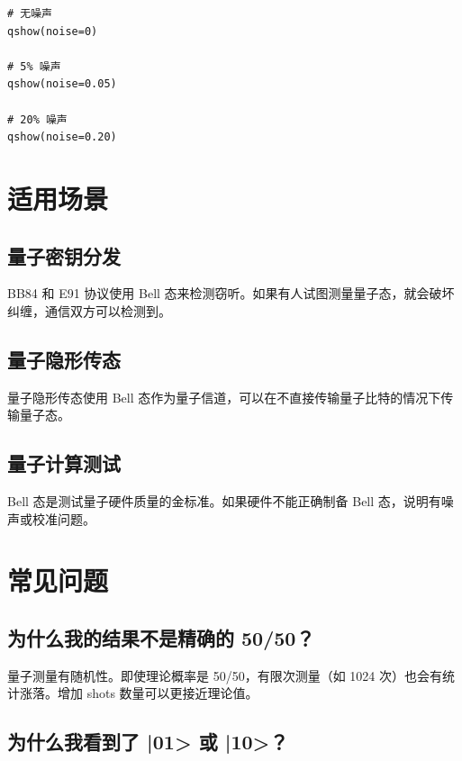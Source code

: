\documentclass[12pt,a4paper]{article}
\begin{document}
\begin{lstlisting}[style=python]
# 无噪声
qshow(noise=0)

# 5% 噪声
qshow(noise=0.05)

# 20% 噪声
qshow(noise=0.20)
\end{lstlisting}

\section{适用场景}

\subsection{量子密钥分发}

BB84 和 E91 协议使用 Bell 态来检测窃听。如果有人试图测量量子态，就会破坏纠缠，通信双方可以检测到。

\subsection{量子隐形传态}

量子隐形传态使用 Bell 态作为量子信道，可以在不直接传输量子比特的情况下传输量子态。

\subsection{量子计算测试}

Bell 态是测试量子硬件质量的金标准。如果硬件不能正确制备 Bell 态，说明有噪声或校准问题。

\section{常见问题}

\subsection{为什么我的结果不是精确的 50/50？}

量子测量有随机性。即使理论概率是 50/50，有限次测量（如 1024 次）也会有统计涨落。增加 shots 数量可以更接近理论值。

\subsection{为什么我看到了 |01> 或 |10>？}
\end{document}
